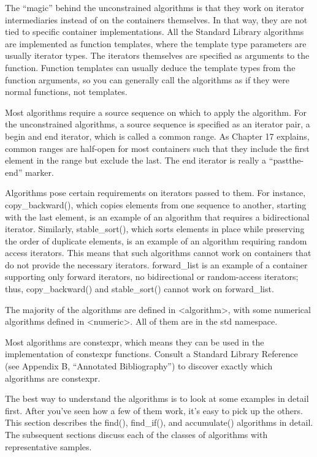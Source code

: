 
The “magic” behind the unconstrained algorithms is that they work on iterator intermediaries instead of on the containers themselves. In that way, they are not tied to specific container implementations. All the Standard Library algorithms are implemented as function templates, where the template type parameters are usually iterator types. The iterators themselves are specified as arguments to the function. Function templates can usually deduce the template types from the function arguments, so you can generally call the algorithms as if they were normal functions, not templates.

Most algorithms require a source sequence on which to apply the algorithm. For the unconstrained algorithms, a source sequence is specified as an iterator pair, a begin and end iterator, which is called a common range. As Chapter 17 explains, common ranges are half-open for most containers such that they include the first element in the range but exclude the last. The end iterator is really a “pastthe-end” marker.

Algorithms pose certain requirements on iterators passed to them. For instance, copy\_backward(), which copies elements from one sequence to another, starting with the last element, is an example of an algorithm that requires a bidirectional iterator. Similarly, stable\_sort(), which sorts elements in place while preserving the order of duplicate elements, is an example of an algorithm requiring random access iterators. This means that such algorithms cannot work on containers that do not provide the necessary iterators. forward\_list is an example of a container supporting only forward iterators, no bidirectional or random-access iterators; thus, copy\_backward() and stable\_sort() cannot work on forward\_list.

The majority of the algorithms are defined in <algorithm>, with some numerical algorithms defined in <numeric>. All of them are in the std namespace.

Most algorithms are constexpr, which means they can be used in the implementation of constexpr functions. Consult a Standard Library Reference (see Appendix B, “Annotated Bibliography”) to discover exactly which algorithms are constexpr.

The best way to understand the algorithms is to look at some examples in detail first. After you’ve seen how a few of them work, it’s easy to pick up the others. This section describes the find(), find\_if(), and accumulate() algorithms in detail. The subsequent sections discuss each of the classes of algorithms with representative samples.

